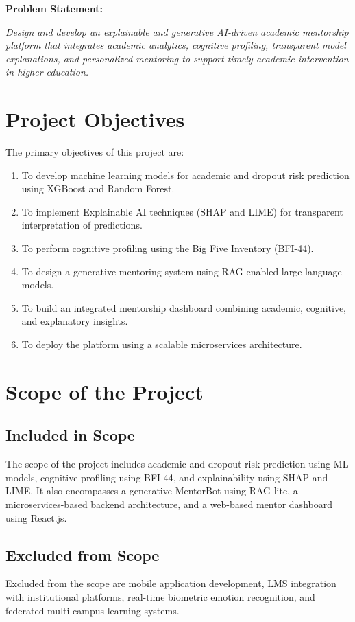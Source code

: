 \documentclass[12pt,a4paper]{report}
\begin{document}
\textbf{Problem Statement:}

\textit{Design and develop an explainable and generative AI-driven academic mentorship platform that integrates academic analytics, cognitive profiling, transparent model explanations, and personalized mentoring to support timely academic intervention in higher education.}

\section{Project Objectives}

The primary objectives of this project are:
\begin{enumerate}
    \item To develop machine learning models for academic and dropout risk prediction using XGBoost and Random Forest.
    \item To implement Explainable AI techniques (SHAP and LIME) for transparent interpretation of predictions.
    \item To perform cognitive profiling using the Big Five Inventory (BFI-44).
    \item To design a generative mentoring system using RAG-enabled large language models.
    \item To build an integrated mentorship dashboard combining academic, cognitive, and explanatory insights.
    \item To deploy the platform using a scalable microservices architecture.
\end{enumerate}

\section{Scope of the Project}

\subsection{Included in Scope}
The scope of the project includes academic and dropout risk prediction using ML models, cognitive profiling using BFI-44, and explainability using SHAP and LIME. It also encompasses a generative MentorBot using RAG-lite, a microservices-based backend architecture, and a web-based mentor dashboard using React.js.

\subsection{Excluded from Scope}
Excluded from the scope are mobile application development, LMS integration with institutional platforms, real-time biometric emotion recognition, and federated multi-campus learning systems.
\end{document}
